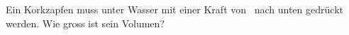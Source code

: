 Ein Korkzapfen muss unter Wasser mit einer Kraft von \FDO\ nach unten gedrückt werden. Wie gross ist sein Volumen?
